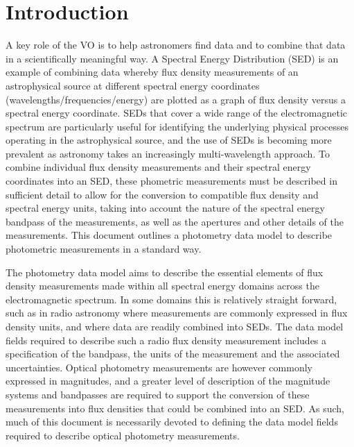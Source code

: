 \documentclass[11pt,a4paper]{ivoa}
\begin{document}
\section{Introduction}
A key role of the VO is to help astronomers find data and to 
combine that data in a scientifically meaningful way. A Spectral 
Energy Distribution (SED) is an example of combining data whereby 
flux density measurements of an astrophysical source at different 
spectral energy coordinates (wavelengths/frequencies/energy)
\citep{doi:10.1146/annurev.astro.41.082801.100251,longo,connell,brujine}
are plotted as a 
graph of flux density versus a spectral energy coordinate. SEDs that 
cover a wide range of the electromagnetic spectrum are particularly 
useful for identifying the underlying physical processes operating 
in the astrophysical source, and the use of SEDs is becoming more 
prevalent as astronomy takes an increasingly multi-wavelength 
approach. To combine individual flux density measurements and their 
spectral energy coordinates into an SED, these phometric measurements 
must be described in sufficient detail to allow for the conversion to 
compatible flux density and spectral energy units,  taking into 
account the nature of the spectral energy bandpass of the measurements, 
as well as the apertures and other details of  the measurements. 
This document outlines a photometry data model to describe photometric 
measurements in a standard way.

The photometry data model aims to describe the essential elements 
of flux density measurements made within all spectral energy domains 
across the electromagnetic spectrum. In some domains this is 
relatively straight forward, such as in radio astronomy where 
measurements are commonly expressed in flux density units, and 
where data are readily combined into SEDs. The data model fields 
required to describe such a radio flux density measurement includes 
a specification of the bandpass, the units of the measurement and 
the associated uncertainties. Optical photometry measurements are 
however commonly expressed in magnitudes, and a greater level of 
description of the magnitude systems and bandpasses are required 
to support the conversion of these measurements into flux densities 
that could be combined into an SED. As such, much of this document 
is necessarily devoted to defining the data model fields required 
to describe optical photometry measurements.
\end{document}
